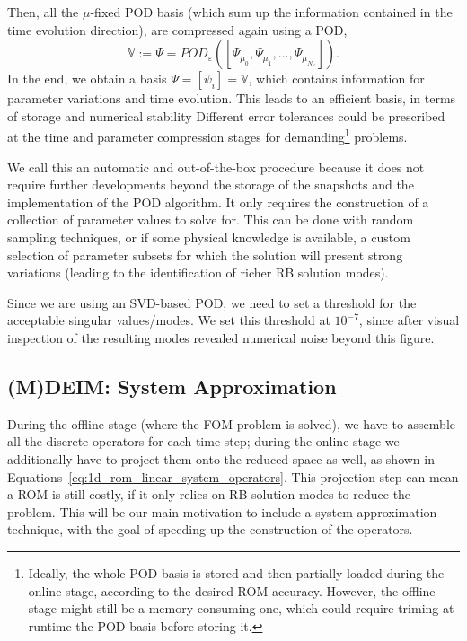 \documentclass[../../thesis.tex]{subfiles}
\newcommand{\rbV}{\ensuremath{\mathbb{V}}}
\begin{document}
Then, all the $\mu$-fixed POD basis 
(which sum up the information contained in the time evolution direction), 
are compressed again using a POD,
\begin{equation*}
    \rbV := \Psi = POD_{\varepsilon} \left(\left[\Psi_{\mu_0}, \Psi_{\mu_1}, \ldots, \Psi_{\mu_{N_{\mu}}}\right]\right).
\end{equation*}
In the end, we obtain a basis $\Psi = [\psi_i] = \rbV$, 
which contains information for parameter variations and time evolution.
This leads to an efficient basis, in terms of storage and numerical stability
Different error tolerances could be prescribed at the time and parameter compression stages
for demanding\footnote
{
    Ideally, the whole POD basis is stored and then
    partially loaded during the online stage,
    according to the desired ROM accuracy.
    However, the offline stage might still be a memory-consuming one,
    which could require triming at runtime the POD basis before storing it.
} problems.

We call this an automatic and out-of-the-box procedure 
because it does not require further developments 
beyond the storage of the snapshots and the implementation of the POD algorithm.
It only requires the construction of a collection of parameter values to solve for.
This can be done with random sampling techniques, 
or if some physical knowledge is available, 
a custom selection of parameter subsets for which the solution will present strong variations 
(leading to the identification of richer RB solution modes).

Since we are using an SVD-based POD, we need to set a threshold for
the acceptable singular values/modes.
We set this threshold at $10^{-7}$,
since after visual inspection of the resulting modes revealed
numerical noise beyond this figure.


\subsection{(M)DEIM: System Approximation}
\label{sec:1d_rom_burgers_system_approximation_deim}
During the offline stage (where the FOM problem is solved), 
we have to assemble all the discrete operators for each time step;
during the online stage we additionally have to project them 
onto the reduced space as well, 
as shown in Equations~\eqref{eq:1d_rom_linear_system_operators}.
This projection step can mean a ROM is still costly,
if it only relies on RB solution modes to reduce the problem.
This will be our main motivation to include a system approximation technique,
with the goal of speeding up the construction of the operators.
\end{document}
